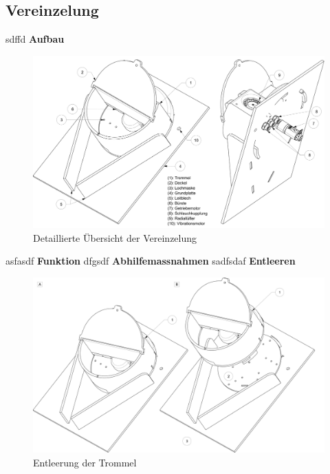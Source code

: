 \subsection{Vereinzelung}
sdffd
\newline
\newline
\textbf{Aufbau}
\newline


	\begin{figure}[H]
	\includegraphics[scale=0.45]{Illustrationen/6-Umsetzung/details_vereinzelung.jpg}
	\caption{Detaillierte Übersicht der Vereinzelung}
	\label{fig:details_vereinzelung}
	\end{figure}
asfasdf
\newline
\textbf{Funktion}
\newline
dfgsdf
\newline
\textbf{Abhilfemassnahmen}
\newline
sadfsdaf
\newline
\textbf{Entleeren}
\newline
	\begin{figure}[H]
	\includegraphics[scale=0.42]{Illustrationen/6-Umsetzung/vereinzelung_entleeren.jpg}
	\caption{Entleerung der Trommel}
	\label{fig:details_vereinzelung}
	\end{figure}
